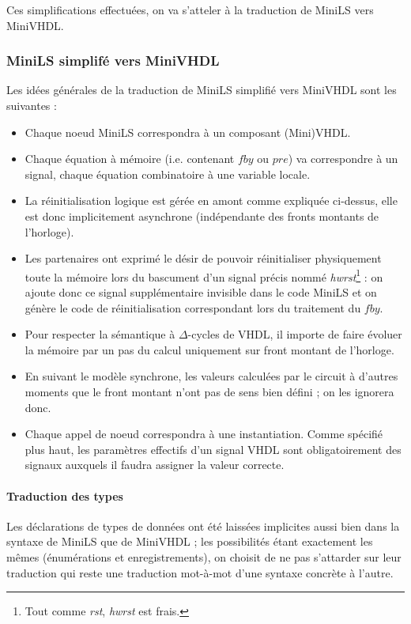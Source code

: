 \documentclass[a4paper]{article}
\begin{document}
Ces simplifications effectu\'ees, on va s'atteler \`a la traduction de MiniLS vers
MiniVHDL.

\subsubsection{MiniLS simplif\'e vers MiniVHDL}

Les id\'ees g\'en\'erales de la traduction de MiniLS simplifi\'e vers MiniVHDL sont les
suivantes :

\begin{itemize}
\item Chaque noeud MiniLS correspondra \`a un composant (Mini)VHDL.
\item Chaque \'equation \`a m\'emoire (i.e. contenant $fby$ ou $pre$) va correspondre
  \`a un signal, chaque \'equation combinatoire \`a une variable locale.
\item La r\'einitialisation logique est g\'er\'ee en amont comme expliqu\'ee ci-dessus,
  elle est donc implicitement asynchrone (ind\'ependante des fronts montants de
  l'horloge).
\item Les partenaires ont exprim\'e le d\'esir de pouvoir r\'einitialiser physiquement
  toute la m\'emoire lors du bascument d'un signal pr\'ecis nomm\'e
  \textit{hwrst}\footnote{Tout comme \textit{rst}, \textit{hwrst} est frais.} :
  on ajoute donc ce signal suppl\'ementaire invisible dans le code MiniLS et on
  g\'en\`ere le code de r\'einitialisation correspondant lors du traitement du $fby$.
\item Pour respecter la s\'emantique \`a $\Delta$-cycles de VHDL, il importe de
  faire \'evoluer la m\'emoire par un pas du calcul uniquement sur front montant de
  l'horloge.
\item En suivant le mod\`ele synchrone, les valeurs calcul\'ees par le circuit \`a
  d'autres moments que le front montant n'ont pas de sens bien d\'efini ; on les
  ignorera donc.
\item Chaque appel de noeud correspondra \`a une instantiation. Comme sp\'ecifi\'e
  plus haut, les param\`etres effectifs d'un signal VHDL sont obligatoirement des
  signaux auxquels il faudra assigner la valeur correcte.
\end{itemize}

\paragraph{Traduction des types}

Les d\'eclarations de types de donn\'ees ont \'et\'e laiss\'ees implicites aussi bien dans
la syntaxe de MiniLS que de MiniVHDL ; les possibilit\'es \'etant exactement les
m\^emes (\'enum\'erations et enregistrements), on choisit de ne pas s'attarder sur
leur traduction qui reste une traduction mot-\`a-mot d'une syntaxe concr\`ete \`a
l'autre.
\end{document}
